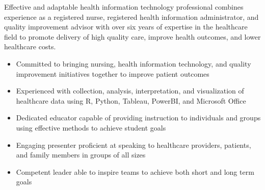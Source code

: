 

\begin{cvparagraph}

Effective and adaptable health information technology professional combines experience as a registered nurse, registered health information administrator, and quality improvement advisor with over six years of expertise in the healthcare field to promote delivery of high quality care, improve health outcomes, and lower healthcare costs.
    \begin{itemize}[topsep=0pt,itemsep=0pt,parsep=0pt,partopsep=0pt,leftmargin=4mm]
      \item Committed to bringing nursing, health information technology, and quality improvement initiatives together to improve patient outcomes    
      \item Experienced with collection, analysis, interpretation, and visualization of healthcare data using R, Python, Tableau, PowerBI, and Microsoft Office
      \item Dedicated educator capable of providing instruction to individuals and groups using effective methods to achieve student goals  
      \item Engaging presenter proficient at speaking to healthcare providers, patients, and family members in groups of all sizes
      \item Competent leader able to inspire teams to achieve both short and long term goals
    \end{itemize}
\end{cvparagraph}
